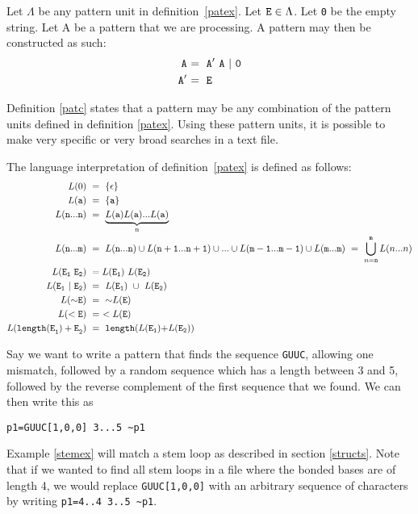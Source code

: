 \begin{mydef}\label{patc}
Let $\Lambda$ be any pattern unit in definition~\ref{patex}. Let ${\tt E}\in\Lambda$.
Let {\tt 0} be the empty string. Let A be a pattern that we are processing.
A pattern may then be constructed as such: 
\begin{align*}
{\tt A~} &{\tt =~A'~A~|~0}\\
{\tt A'~} &{\tt=~E}
\end{align*}
\end{mydef}
Definition \ref{patc} states that a pattern may be any combination of the pattern 
units defined in definition \ref{patex}.
Using these pattern units, it is possible to make very specific or very broad 
searches in a text file. 
\begin{mydef}\label{patlint}
The language interpretation of definition~\ref{patex} is defined as follows:
\begin{align*}
L(0)~&=~\{\epsilon\}\\
L({\tt a})~&=~\{{\tt a}\}\\
L({\tt n...n})~&=~\underbrace{L({\tt a})L({\tt a})...L({\tt a})}_\text{n}\\
L({\tt n...m})~&=~L({\tt n...n})\cup L({\tt n+1...n+1})\cup...\cup L({\tt m-1...m-1})\cup L({\tt m...m})~=~\bigcup\limits_{n={\tt n}}^{\tt m} L(n...n)\\
L({\tt E_1~E_2})~&=L({\tt E_1})~L({\tt E_2})\\
L({\tt E_1~|~E_2})~&=~L({\tt E}_{\tt 1})~\cup~L({\tt E}_{\tt 2})\\
L({\tt {\sim}E})~&=~{\sim}L({\tt E})\\
L({\tt <E})~&=~<L({\tt E})\\
L({\tt length(E}_{\tt 1}{\tt )+ E}_{\tt 2}{\tt })~&=~{\tt length(}L({\tt E}_{\tt 1}{\tt )+} L({\tt E}_{\tt 2}{\tt )})
\end{align*}
\end{mydef}

\begin{myex}\label{stemex}
Say we want to write a pattern that finds the sequence {\tt GUUC}, allowing 
one mismatch, followed by a random sequence which has a length between 3 and 5, 
followed by the reverse complement of the first sequence that we found. We can 
then write this as \begin{center}
{\tt p1=GUUC[1,0,0] 3...5 \textasciitilde p1}
\end{center}
\end{myex}
Example \ref{stemex} will match a stem loop as described in section 
\ref{structs}. Note that if we wanted to find all stem loops in a file where 
the bonded bases are of length 
4, we would replace {\tt GUUC[1,0,0]} with an arbitrary sequence of characters 
by writing {\tt p1=4..4 3..5 \textasciitilde p1}. 
